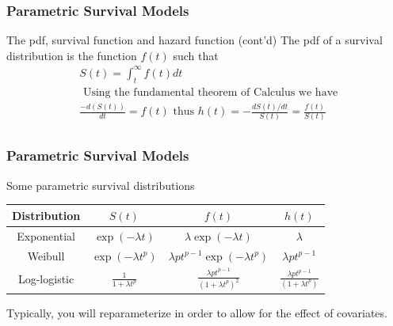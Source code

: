 \documentclass{beamer}
\theoremstyle{definition}
\begin{document}
\begin{frame}
\frametitle{Parametric Survival Models}
\begin{block}{The pdf, survival function and hazard function (cont'd)}
The pdf of a survival distribution is the function $f(t)$ such that
\begin{align*}
& S(t) = \int_t^\infty f(t) dt \\
& \text{ Using the fundamental theorem of Calculus we have } \\
& \frac{-d(S(t))}{dt} = f(t) \text{ thus } h(t) = -\frac{d S(t)/dt}{S(t)} = \frac{f(t)}{S(t)} \\
\end{align*}
\end{block}
\end{frame}

\begin{frame}
\frametitle{Parametric Survival Models}
\begin{block}{Some parametric survival distributions}
\begin{center}
\begin{tabular}{ c c c c }
Distribution & $S(t)$ & $f(t)$ & $h(t)$  \\    \hline                                                                                                                                          
Exponential  & $\exp(-\lambda t)$  & $\lambda \exp(-\lambda t)$ & $\lambda$    \\                                                                                                                     
Weibull      & $\exp(-\lambda t^p)$ & $ \lambda p t^{p-1} \exp(-\lambda t^p)$ & $\lambda p  t^{p-1}$  \\                                                                                                     
Log-logistic & $\frac{1}{1 + \lambda t^p}$ & $\frac{\lambda p t^{p-1}}{(1+\lambda t^p)^2}$ & $\frac{\lambda p t^{p-1}}{(1+\lambda t^p)}$ \\ \hline
\end{tabular}
\end{center}
\end{block} 
Typically, you will reparameterize in order to allow for the effect of covariates. 
\end{frame} 
\end{document}
